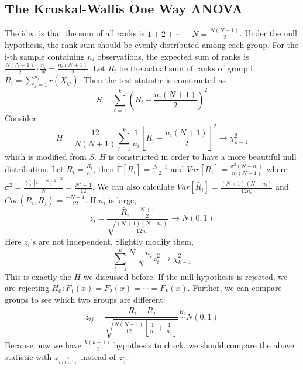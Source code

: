 \documentclass[twoside]{article}
\begin{document}
	\subsection{The Kruskal-Wallis One Way ANOVA}
	The idea is that the sum of all ranks is $1 + 2 + \cdots + N = \frac{N(N+1)}{2}$. Under the null hypothesis, the rank sum should be evenly distributed among each group. For the i-th sample containing $n_i$ observations, the expected sum of ranks is $\frac{N(N+1)}{2} \cdot \frac{n_i}{N} = \frac{n_i (N+1)}{2}$. Let $R_i$ be the actual sum of ranks of group i $R_i = \sum_{j=1}^{n_i} r(X_{ij})$. Then the test statistic is constructed as
	$$
	S = \sum_{i=1}^{k} \left( R_i - \frac{n_i (N+1)}{2} \right)^2
	$$
	Consider
	$$
	H = \frac{12}{N(N+1)} \sum_{i=1}^{k} \frac{1}{n_i} \left[ R_i - \frac{n_i (N+1)}{2} \right]^2 \to \chi_{k-1}^2
	$$
	which is modified from $S$. $H$ is constructed in order to have a more beautiful null distribution. Let $\bar{R}_i = \frac{R_i}{n_i}$, then $\mathbb{E} \left[ \bar{R}_i \right] = \frac{N+1}{2}$ and $Var \left[ \bar{R}_i \right] = \frac{\sigma^2 (N-n_i)}{n_i (N-1)}$ where $\sigma^2 = \frac{\sum \left[ i - \frac{N+1}{2} \right]^2}{N} = \frac{N^2 - 1}{12}$. We can also calculate $Var \left[ \bar{R}_i \right] = \frac{(N+1)(N-n_i)}{12 n_i}$ and $Cov \left( \bar{R}_i, \bar{R}_j \right) = \frac{-N+1}{12}$. If $n_i$ is large, 
	$$
	z_i = \frac{\bar{R}_i - \frac{N+1}{2}}{\sqrt{\frac{(N+1)(N-n_i)}{12 n_i}}} \rightarrow N(0,1)
	$$
	Here $z_i$'s are not independent. Slightly modify them, 
	$$
	\sum_{i=1}^{k} \frac{N-n_i}{N} z_i^2 \rightarrow \chi_{k-1}^2
	$$
	This is exactly the $H$ we discussed before. If the null hypothesis is rejected, we are rejecting $H_0: F_1(x)=F_2(x)=\cdots=F_k(x)$. Further, we can compare groups to see which two groups are different: 
	$$
	z_{ij} = \frac{\bar{R}_i - \bar{R}_j}{\sqrt{\frac{N(N+1)}{12} \left[ \frac{1}{n_i} + \frac{1}{n_j} \right]}} \stackrel{H_0}{\sim} N(0,1)
	$$
	Because now we have $\frac{k(k-1)}{2}$ hypothesis to check, we should compare the above statistic with $z_{\frac{\alpha}{k(k-1)}}$ instead of $z_{\frac{\alpha}{2}}$. 
	
\end{document}

